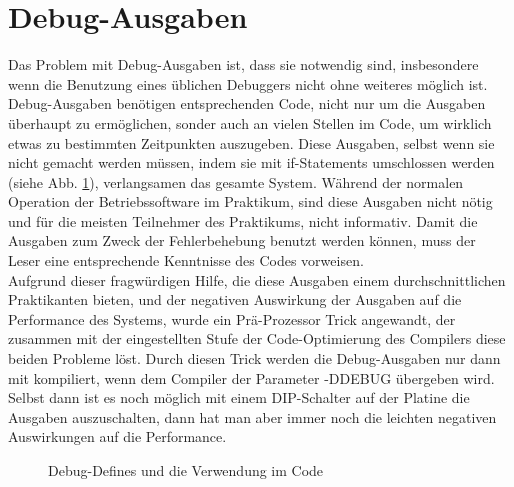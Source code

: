 \section{Debug-Ausgaben \label{impl_debug}}
Das Problem mit Debug-Ausgaben ist, dass sie notwendig sind, insbesondere wenn die Benutzung eines üblichen Debuggers nicht
ohne weiteres möglich ist. Debug-Ausgaben benötigen entsprechenden Code, nicht nur um die Ausgaben überhaupt zu ermöglichen,
sonder auch an vielen Stellen im Code, um wirklich etwas zu bestimmten Zeitpunkten auszugeben. Diese Ausgaben, selbst wenn
sie nicht gemacht werden müssen, indem sie mit if-Statements umschlossen werden (siehe Abb. \ref{debug_trick}), verlangsamen
das gesamte System. Während der normalen Operation der Betriebssoftware im Praktikum, sind diese Ausgaben nicht nötig und für
die meisten Teilnehmer des Praktikums, nicht informativ. Damit die Ausgaben zum Zweck der Fehlerbehebung benutzt werden können,
muss der Leser eine entsprechende Kenntnisse des Codes vorweisen.\\
Aufgrund dieser fragwürdigen Hilfe, die diese Ausgaben einem durchschnittlichen Praktikanten bieten, und der negativen Auswirkung
der Ausgaben auf die Performance des Systems, wurde ein Prä-Prozessor Trick angewandt, der zusammen mit der eingestellten Stufe
der Code-Optimierung des Compilers diese beiden Probleme löst. Durch diesen Trick werden die Debug-Ausgaben nur dann mit kompiliert,
wenn dem Compiler der Parameter -DDEBUG übergeben wird. Selbst dann ist es noch möglich mit einem DIP-Schalter auf der Platine
die Ausgaben auszuschalten, dann hat man aber immer noch die leichten negativen Auswirkungen auf die Performance.
\begin{figure}[htb]
 \centering
 \caption{\label{debug_trick}Debug-Defines und die Verwendung im Code}
\end{figure}
